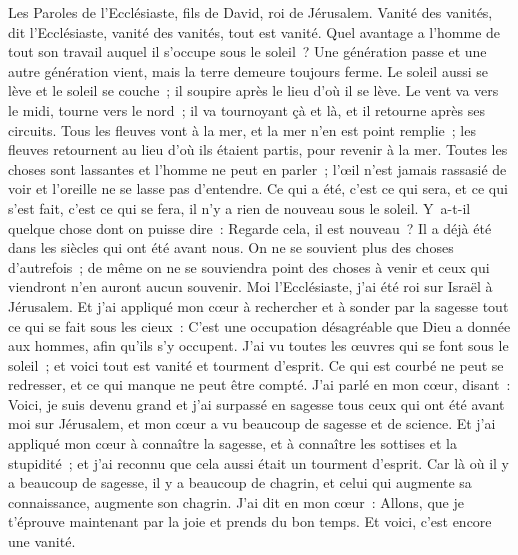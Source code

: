 \begin{multicols}{2}
\VerseOne{}Les Paroles de l'Ecclésiaste, fils de David, roi de Jérusalem.
Vanité des vanités, dit l'Ecclésiaste, vanité des vanités, tout est vanité.
Quel avantage a l'homme de tout son travail auquel il s'occupe sous le soleil~?
Une génération passe et une autre génération vient, mais la terre demeure toujours ferme.
Le soleil aussi se lève et le soleil se couche~; il soupire après le lieu d'où il se lève.
Le vent va vers le midi, tourne vers le nord~; il va tournoyant çà et là, et il retourne après ses circuits.
Tous les fleuves vont à la mer, et la mer n'en est point remplie~; les fleuves retournent au lieu d'où ils étaient partis, pour revenir à la mer. 
Toutes les choses sont lassantes et l'homme ne peut en parler~; l'œil n'est jamais rassasié de voir et l'oreille ne se lasse pas d'entendre. 
Ce qui a été, c'est ce qui sera, et ce qui s'est fait, c'est ce qui se fera, il n'y a rien de nouveau sous le soleil.
Y~a-t-il quelque chose dont on puisse dire~: Regarde cela, il est nouveau~? Il a déjà été dans les siècles qui ont été avant nous.
On ne se souvient plus des choses d'autrefois~; de même on ne se souviendra point des choses à venir et ceux qui viendront n'en auront aucun souvenir. 
Moi l'Ecclésiaste, j'ai été roi sur Israël à Jérusalem.
Et j'ai appliqué mon cœur à rechercher et à sonder par la sagesse tout ce qui se fait sous les cieux~: C'est une occupation désagréable que Dieu a donnée aux hommes, afin qu'ils s'y occupent.
J'ai vu toutes les œuvres qui se font sous le soleil~; et voici tout est vanité et tourment d'esprit.
Ce qui est courbé ne peut se redresser, et ce qui manque ne peut être compté.
J'ai parlé en mon cœur, disant~: Voici, je suis devenu grand et j'ai surpassé en sagesse tous ceux qui ont été avant moi sur Jérusalem, et mon cœur a vu beaucoup de sagesse et de science.
Et j'ai appliqué mon cœur à connaître la sagesse, et à connaître les sottises et la stupidité~; et j'ai reconnu que cela aussi était un tourment d'esprit.
Car là où il y a beaucoup de sagesse, il y a beaucoup de chagrin, et celui qui augmente sa connaissance, augmente son chagrin.
\VerseOne{}J'ai dit en mon cœur~: Allons, que je t'éprouve maintenant par la joie et prends du bon temps. Et voici, c'est encore une vanité.

\end{multicols}
